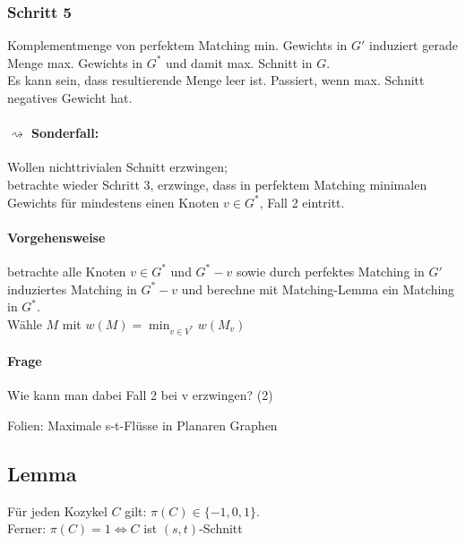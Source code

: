 \documentclass{article}
\begin{document}
\subsubsection{Schritt 5}
Komplementmenge von perfektem Matching min. Gewichts in $G'$ induziert gerade Menge max. Gewichts in $G^*$ und damit max. Schnitt in $G$.\\
Es kann sein, dass resultierende Menge leer ist. Passiert, wenn max. Schnitt negatives Gewicht hat.
\paragraph{$\rightsquigarrow$ Sonderfall:} Wollen nichttrivialen Schnitt erzwingen;\\
betrachte wieder Schritt 3, erzwinge, dass in perfektem Matching minimalen Gewichts für mindestens einen Knoten $v \in G^*$, Fall 2 eintritt.
\paragraph{Vorgehensweise} betrachte alle Knoten $v \in G^*$ und $G^* - v$ sowie durch perfektes Matching in $G'$ induziertes Matching in $G^* - v$ und berechne mit Matching-Lemma ein Matching in $G^*$.\\
Wähle $M$ mit $w(M) = \min_{v\in V^*}w(M_v)$

\paragraph{Frage}
Wie kann man dabei Fall 2 bei v erzwingen?
(2)


Folien: Maximale s-t-Flüsse in Planaren Graphen

\subsection{Lemma}
Für jeden Kozykel $C$ gilt: $\pi(C) \in \{-1,0,1\}$.\\
Ferner: $\pi(C) = 1 \Longleftrightarrow C$ ist $(s,t)$-Schnitt
\end{document}
